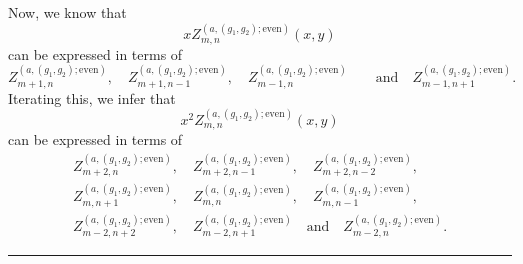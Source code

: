 \documentclass{article}
\numberwithin{equation}{section}
\numberwithin{figure}{section}
\begin{document}
Now, we know that
%
\begin{equation*}
x Z^{(a,(g_1,g_2);\mathrm{even})}_{m,n}(x,y)
\end{equation*}
%
can be expressed in terms of
%
\begin{equation*}
Z^{(a,(g_1,g_2);\mathrm{even})}_{m+1,n}, \quad
Z^{(a,(g_1,g_2);\mathrm{even})}_{m+1,n-1}, \quad
Z^{(a,(g_1,g_2);\mathrm{even})}_{m-1,n} \quad
\quad \text{and} \quad
Z^{(a,(g_1,g_2);\mathrm{even})}_{m-1,n+1}.
\end{equation*}
%
Iterating this, we infer that
%
\begin{equation*}
x^2 Z^{(a,(g_1,g_2);\mathrm{even})}_{m,n}(x,y)
\end{equation*}
%
can be expressed in terms of
%
\begin{equation*}
\begin{gathered}
Z^{(a,(g_1,g_2);\mathrm{even})}_{m+2,n}, \quad
Z^{(a,(g_1,g_2);\mathrm{even})}_{m+2,n-1}, \quad
Z^{(a,(g_1,g_2);\mathrm{even})}_{m+2,n-2},\\
Z^{(a,(g_1,g_2);\mathrm{even})}_{m,n+1}, \quad
Z^{(a,(g_1,g_2);\mathrm{even})}_{m,n}, \quad
Z^{(a,(g_1,g_2);\mathrm{even})}_{m,n-1},\\
Z^{(a,(g_1,g_2);\mathrm{even})}_{m-2,n+2}, \quad
Z^{(a,(g_1,g_2);\mathrm{even})}_{m-2,n+1} \quad\text{and}\quad
Z^{(a,(g_1,g_2);\mathrm{even})}_{m-2,n}.
\end{gathered}
\end{equation*}
%

\noindent\rule{\linewidth}{2pt}





\end{document}

